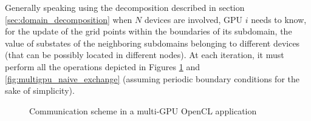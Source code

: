 Generally speaking using the decomposition described in section \ref{sec:domain_decomposition} when $N$ devices are involved, GPU $i$ needs to know, for the update of the grid points within the boundaries of its subdomain, the value of substates of the neighboring subdomains belonging to different devices (that can be possibly located in different nodes). 
At each iteration, it must perform all the operations depicted in Figures \ref{fig:communication_scheme} and \ref{fig:multigpu_naive_exchange} (assuming periodic boundary conditions for the sake of simplicity).
\begin{figure}[H]
\caption{Communication scheme in a multi-GPU OpenCL application}
\label{fig:communication_scheme}
\end{figure}


